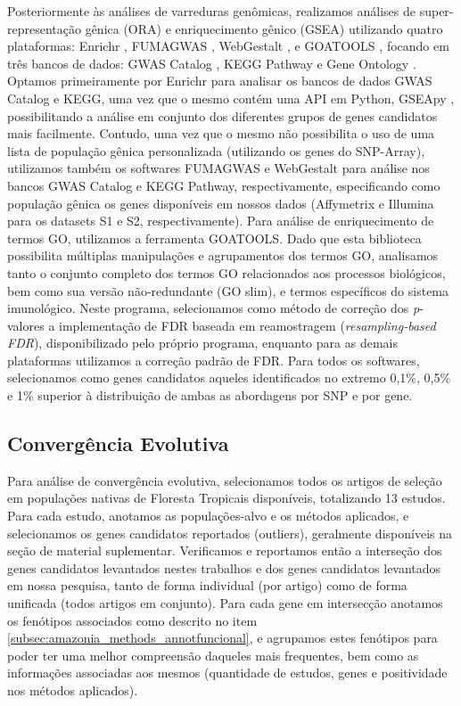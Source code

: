 Posteriormente às análises de varreduras genômicas, realizamos análises de super-representação gênica (ORA) e enriquecimento gênico (GSEA) utilizando quatro plataformas: Enrichr \cite{chen_enrichr_2013,kuleshov_enrichr_2016}, FUMAGWAS \cite{watanabe_functional_2017}, WebGestalt \cite{zhang_webgestalt_2005,wang_webgestaltr_2020}, e GOATOOLS \cite{klopfenstein_goatools_2018}, focando em três bancos de dados: GWAS Catalog \cite{macarthur_new_2017}, KEGG Pathway \cite{kanehisa_kegg_2000} e Gene Ontology \cite{ashburner_gene_2000,thegeneontologyconsortium_gene_2019}. Optamos primeiramente por Enrichr para analisar os bancos de dados GWAS Catalog e KEGG, uma vez que o mesmo contém uma API em Python, GSEApy \cite{fang_gseapy_2020}, possibilitando a análise em conjunto dos diferentes grupos de genes candidatos mais facilmente. Contudo, uma vez que o mesmo não possibilita o uso de uma lista de população gênica personalizada (utilizando os genes do SNP-Array), utilizamos também os softwares FUMAGWAS e WebGestalt para análise nos bancos GWAS Catalog e KEGG Pathway, respectivamente, especificando como população gênica os genes disponíveis em nossos dados (Affymetrix e Illumina para os datasets S1 e S2, respectivamente). Para análise de enriquecimento de termos GO, utilizamos a ferramenta GOATOOLS. Dado que esta biblioteca possibilita múltiplas manipulações e agrupamentos dos termos GO, analisamos tanto o conjunto completo dos termos GO relacionados aos processos biológicos, bem como sua versão não-redundante (GO slim), e termos específicos do sistema imunológico. Neste programa, selecionamos como método de correção dos \emph{p}-valores a implementação de FDR baseada em reamostragem (\emph{resampling-based FDR}), disponibilizado pelo próprio programa, enquanto para as demais plataformas utilizamos a correção padrão de FDR. Para todos os softwares, selecionamos como genes candidatos aqueles identificados no extremo 0,1\%, 0,5\% e 1\% superior à distribuição de ambas as abordagens por SNP e por gene.

\subsection{Convergência Evolutiva}

Para análise de convergência evolutiva, selecionamos todos os artigos de seleção em populações nativas de Floresta Tropicais disponíveis, totalizando 13 estudos. Para cada estudo, anotamos as populações-alvo e os métodos aplicados, e selecionamos os genes candidatos reportados (outliers), geralmente disponíveis na seção de material suplementar. Verificamos e reportamos então a interseção dos genes candidatos levantados nestes trabalhos e dos genes candidatos levantados em nossa pesquisa, tanto de forma individual (por artigo) como de forma unificada (todos artigos em conjunto). Para cada gene em intersecção anotamos os fenótipos associados como descrito no item \ref{subsec:amazonia_methods_annotfuncional}, e agrupamos estes fenótipos para poder ter uma melhor compreensão daqueles mais frequentes, bem como as informações associadas aos mesmos (quantidade de estudos, genes e positividade nos métodos aplicados).

